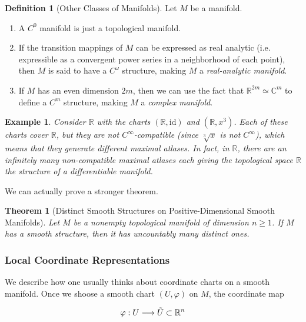 \documentclass{article}
\newtheorem{theorem}{Theorem}[section]
\newtheorem{example}{Example}[section]
\theoremstyle{remark}
\theoremstyle{definition}
\newtheorem{definition}{Definition}[section]
\begin{document}
    \begin{definition}[Other Classes of Manifolds] Let $M$ be a manifold. 
      \begin{enumerate}
        \item A $C^0$ manifold is just a topological manifold. 
        \item If the transition mappings of $M$ can be expressed as real analytic (i.e. expressible as a convergent power series in a neighborhood of each point), then $M$ is said to have a $C^\omega$ structure, making $M$ a \textit{real-analytic manifold}. 
        \item If $M$ has an even dimension $2m$, then we can use the fact that $\mathbb{R}^{2m} \simeq \mathbb{C}^m$ to define a $C^m$ structure, making $M$ a \textit{complex manifold}. 
      \end{enumerate}
    \end{definition}

    \begin{example}
      Consider $\mathbb{R}$ with the charts $(\mathbb{R}, \text{id})$ and $(\mathbb{R}, x^3)$. Each of these charts cover $\mathbb{R}$, but they are not $C^\infty$-compatible (since $\sqrt[3]{x}$ is not $C^\infty$), which means that they generate different maximal atlases. In fact, in $\mathbb{R}$, there are an infinitely many non-compatible maximal atlases each giving the topological space $\mathbb{R}$ the structure of a differentiable manifold. 
    \end{example}

    We can actually prove a stronger theorem. 

    \begin{theorem}[Distinct Smooth Structures on Positive-Dimensional Smooth Manifolds]
      Let $M$ be a nonempty topological manifold of dimension $n \geq 1$. If $M$ has a smooth structure, then it has uncountably many distinct ones. 
    \end{theorem}

    \subsubsection{Local Coordinate Representations}

      We describe how one usually thinks about coordinate charts on a smooth manifold. Once we shoose a smooth chart $(U, \varphi)$ on $M$, the coordinate map 

        \[\varphi: U \longrightarrow \Tilde{U} \subset \mathbb{R}^n\]
\end{document}
